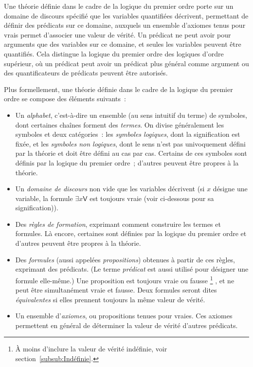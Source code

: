 Une théorie définie dans le cadre de la logique du premier ordre porte sur un domaine de discours spécifié que les variables quantifiées décrivent, permettant de définir des prédicats sur ce domaine, auxquels un ensemble d'axiomes tenus pour vrais permet d'associer une valeur de vérité. 
Un prédicat ne peut avoir pour arguments que des variables sur ce domaine, et seules les variables peuvent être quantifiés. 
Cela distingue la logique du premier ordre des logiques d'ordre supérieur, où un prédicat peut avoir un prédicat plus général comme argument ou des quantificateurs de prédicats peuvent être autorisés.

Plus formellement, une théorie définie dans le cadre de la logique du premier ordre se compose des éléments suivants : 
\begin{itemize}[nosep]
    \item Un \textit{alphabet}, c'est-à-dire un ensemble (au sens intuitif du terme) de symboles, dont certaines chaînes forment des \textit{termes}. 
          On divise généralement les symboles et deux catégories : les \textit{symboles logiques}, dont la signification est fixée, et les \textit{symboles non logiques}, dont le sens n'est pas univoquement défini par la théorie et doit être défini au cas par cas. 
          Certains de ces symboles sont définis par la logique du premier ordre ; d'autres peuvent être propres à la théorie. 
    \item Un \textit{domaine de discours} non vide que les variables décrivent (si $x$ désigne une variable, la formule $\exists x \mathsf{V}$ est toujours vraie (voir ci-dessous pour sa signification)).
    \item Des \textit{règles de formation}, exprimant comment construire les termes et formules. 
          Là encore, certaines sont définies par la logique du premier ordre et d'autres peuvent être propres à la théorie.
    \item Des \textit{formules} (aussi appelées \textit{propositions}) obtenues à partir de ces règles, exprimant des prédicats. 
        (Le terme \textit{prédicat} est aussi utilisé pour désigner une formule elle-même.)
        Une proposition est toujours vraie ou fausse%
        \footnote{À moins d'inclure la valeur de vérité indéfinie, voir section~\ref{subsub:Indéfinie}.}%
        , et ne peut être simultanément vraie et fausse. 
        Deux formules seront dites \textit{équivalentes} si elles prennent toujours la même valeur de vérité. 
    \item Un ensemble d'\textit{axiomes}, ou propositions tenues pour vraies. 
          Ces axiomes permettent en général de déterminer la valeur de vérité d'autres prédicats.
\end{itemize}

